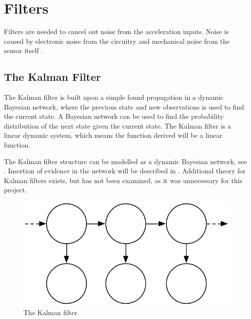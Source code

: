 \section{Filters}\label{sec:filters}
Filters are needed to cancel out noise from the acceleration inputs.
Noise is caused by electronic noise from the circuitry and mechanical noise from the sensor itself \citep{misc:SensorsMag}.

\subsection{The Kalman Filter} 
The Kalman filter is built upon a simple found propagation in a dynamic Bayesian network, where the previous state and new observations is used to find the current state.
A Bayesian network can be used to find the probability distribution of the next state given the current state.
The Kalman filter is a linear dynamic system, which means the function derived will be a linear function.

The Kalman filter structure can be modelled as a dynamic Bayesian network, see .
Insertion of evidence in the network will be described in .
Additional theory for Kalman filters exists, but has not been examined, as it was unnecessary for this project.
\begin{figure}[H]
	\centering
	\includegraphics[scale=0.6]{media/kalman-filter}
	\caption{The Kalman filter.}
	\label{fig:kalman-filter}
\end{figure}

